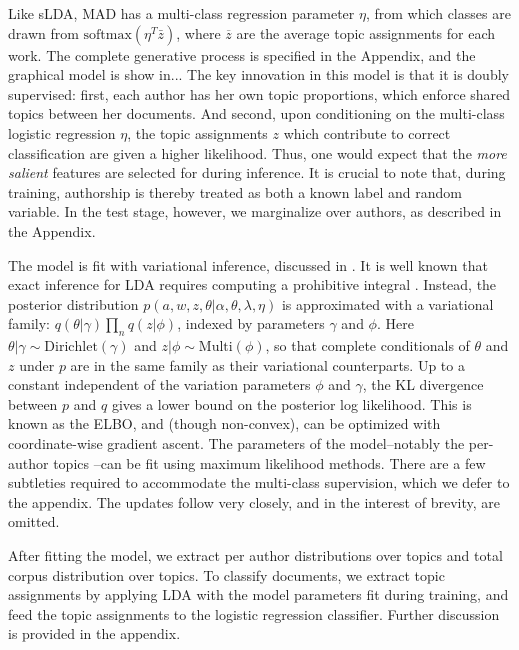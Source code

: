\documentclass[14pt]{article} %
\theoremstyle{plain}
\theoremstyle{definition}
\theoremstyle{remark}
\begin{document}
Like sLDA, MAD has a multi-class regression parameter $\eta$, from which classes are drawn from $\text{softmax}(\eta^T\bar{z})$, where $\overline{z}$ are the average topic assignments for each work. The complete generative process is specified in the Appendix, and the graphical model is show in... The key innovation in this model is that it is doubly supervised: first, each author has her own topic proportions, which enforce shared topics between her documents. And second, upon conditioning on the multi-class logistic regression $\eta$, the topic assignments $z$ which contribute to correct classification are given a higher likelihood.  Thus, one would expect that the \emph{more salient} features are selected for during inference. It is crucial to note that, during training, authorship is thereby treated as both a known label and random variable. In the test stage, however, we marginalize over authors, as described in the Appendix.

The model is fit with variational inference, discussed in \cite{wainwright2008graphical}. It is well known that exact inference for LDA requires computing a prohibitive integral \cite{Blei2003}. Instead, the posterior distribution $p(a,w,z,\theta|\alpha,\theta,\lambda,\eta)$ is approximated with a variational family: $q(\theta|\gamma)\prod_{n}q(z|\phi)$, indexed by parameters $\gamma$ and $\phi$. Here $\theta|\gamma \sim\text{Dirichlet}(\gamma)$ and $z|\phi \sim\text{Multi}(\phi)$, so that complete conditionals of $\theta$ and $z$ under $p$ are in the same family as their variational counterparts. Up to a constant independent of the variation parameters $\phi$ and $\gamma$, the KL divergence between $p$ and $q$ gives a lower bound on the posterior log likelihood. This is known as the ELBO, and (though non-convex), can be optimized with coordinate-wise gradient ascent. The parameters of the model--notably the per-author topics --can be fit using maximum likelihood methods. There are a few subtleties required to accommodate the multi-class supervision, which we defer to the appendix. The updates follow \cite{wang2009simultaneous} very closely, and in the interest of brevity, are omitted. 

After fitting the model, we extract per author distributions over topics and total corpus distribution over topics. To classify documents, we extract topic assignments by applying LDA with the model parameters fit during training, and feed the topic assignments to the logistic regression classifier. Further discussion is provided in the appendix. 
\end{document}
